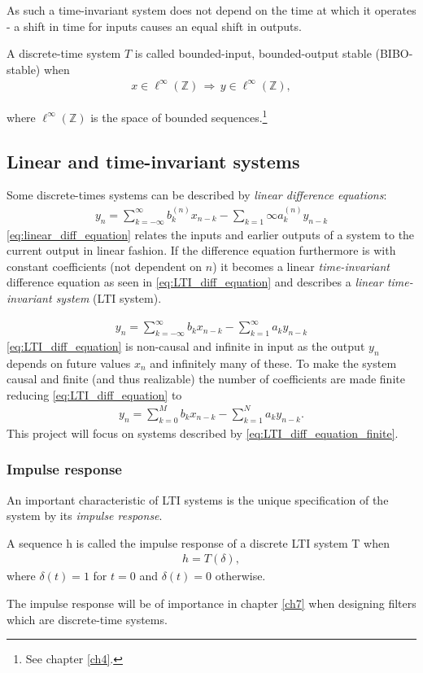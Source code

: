 As such a time-invariant system does not depend on the time at which it operates - a shift in time for inputs causes an equal shift in outputs.
\begin{definition}\label{def:BIBO_stable_system}
A discrete-time system $T$ is called bounded-input, bounded-output stable (BIBO-stable) when
\begin{align}
x\in\ell^{\infty}(\mathbb{Z})\,\Rightarrow\,y\in\ell^{\infty}(\mathbb{Z}),
\end{align}

where $\ell^{\infty}(\mathbb{Z})$ is the space of bounded sequences.\footnote{See chapter \ref{ch4}.}
\end{definition}

\subsection{Linear and time-invariant systems}
Some discrete-times systems can be described by \textit{linear difference equations}:
\begin{align}\label{eq:linear_diff_equation}
y_n=\sum_{k=-\infty}^{\infty}b_k^{(n)}x_{n-k}-\sum_{k=1}{\infty}a_k^{(n)}y_{n-k}
\end{align}
\eqref{eq:linear_diff_equation} relates the inputs and earlier outputs of a system to the current output in linear fashion. If the difference equation furthermore is with constant coefficients (not dependent on $n$) it becomes a linear \textit{time-invariant} difference equation as seen in \eqref{eq:LTI_diff_equation} and describes a \textit{linear time-invariant system} (LTI system).

\begin{align}\label{eq:LTI_diff_equation}
y_n=\sum_{k=-\infty}^{\infty}b_kx_{n-k}-\sum_{k=1}^{\infty}a_ky_{n-k}
\end{align}
\eqref{eq:LTI_diff_equation} is non-causal and infinite in input as the output $y_n$ depends on future values $x_n$ and infinitely many of these. To make the system causal and finite (and thus realizable) the number of coefficients are made finite reducing \eqref{eq:LTI_diff_equation} to
\begin{align}\label{eq:LTI_diff_equation_finite}
y_n=\sum_{k=0}^Mb_kx_{n-k}-\sum_{k=1}^Na_ky_{n-k}.
\end{align}
This project will focus on systems described by \eqref{eq:LTI_diff_equation_finite}.
\subsubsection{Impulse response}
An important characteristic of LTI systems is the unique specification of the system by its \textit{impulse response}.
\begin{definition}\label{def:impulse_response}
A sequence h is called the impulse response of a discrete LTI system T when
\begin{align}
h=T(\delta),
\end{align}
where $\delta(t)=1$ for $t=0$ and $\delta(t)=0$ otherwise.
\end{definition}
The impulse response will be of importance in chapter \ref{ch7} when designing filters which are discrete-time systems.